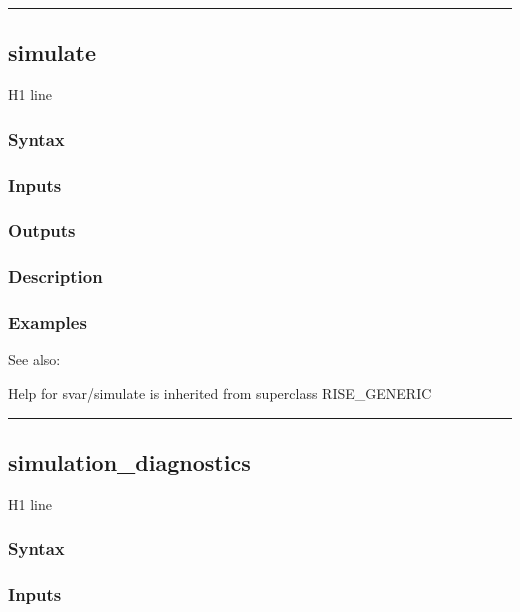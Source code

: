 \documentclass[letterpaper,10pt,english]{sphinxmanual}
\begin{document}
\bigskip\hrule{}\bigskip



\subsection{simulate}
\label{classes/models/@svar/svar:id113}\label{classes/models/@svar/svar:simulate}
H1 line


\subsubsection{Syntax}
\label{classes/models/@svar/svar:id114}

\subsubsection{Inputs}
\label{classes/models/@svar/svar:id115}

\subsubsection{Outputs}
\label{classes/models/@svar/svar:id116}

\subsubsection{Description}
\label{classes/models/@svar/svar:id117}

\subsubsection{Examples}
\label{classes/models/@svar/svar:id118}
See also:

Help for svar/simulate is inherited from superclass RISE\_GENERIC


\bigskip\hrule{}\bigskip



\subsection{simulation\_diagnostics}
\label{classes/models/@svar/svar:id119}\label{classes/models/@svar/svar:simulation-diagnostics}
H1 line


\subsubsection{Syntax}
\label{classes/models/@svar/svar:id120}

\subsubsection{Inputs}
\label{classes/models/@svar/svar:id121}
\end{document}

